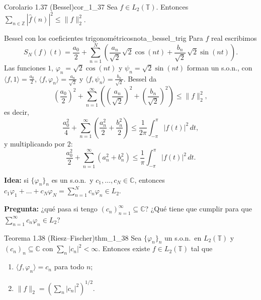 \begin{proposicion}{Corolario 1.37 (Bessel)}{cor_1_37}
Sea $f \in L_2(\mathbb{T})$. Entonces $\displaystyle\sum_{n\in\mathbb{Z}}|\hat{f}(n)|^2 \le \|f\|_2^2$.
\end{proposicion}

\begin{nota}{Bessel con los coeficientes trigonométricos}{nota_bessel_trig}
Para $f$ real escribimos
\[
S_N(f)(t) = \frac{a_0}{2} + \sum_{n=1}^{N}\left(\frac{a_n}{\sqrt{2}}\,\sqrt{2}\cos(nt) + \frac{b_n}{\sqrt{2}}\,\sqrt{2}\sin(nt)\right).
\]
Las funciones $1$, $\varphi_n = \sqrt{2}\cos(nt)$ y $\psi_n = \sqrt{2}\sin(nt)$ forman un s.o.n., con $\langle f, 1\rangle = \frac{a_0}{2}$, $\langle f, \varphi_n\rangle = \frac{a_n}{\sqrt{2}}$ y $\langle f, \psi_n\rangle = \frac{b_n}{\sqrt{2}}$. Bessel da
\[
\left(\frac{a_0}{2}\right)^2 + \sum_{n=1}^{\infty}\left(\left(\frac{a_n}{\sqrt{2}}\right)^2 + \left(\frac{b_n}{\sqrt{2}}\right)^2\right) \le \|f\|_2^2,
\]
es decir,
\[
\frac{a_0^2}{4} + \sum_{n=1}^{\infty}\left(\frac{a_n^2}{2} + \frac{b_n^2}{2}\right) \le \frac{1}{2\pi}\int_{-\pi}^{\pi}|f(t)|^2\,dt,
\]
y multiplicando por $2$:
\[
\frac{a_0^2}{2} + \sum_{n=1}^{\infty}(a_n^2 + b_n^2) \le \frac{1}{\pi}\int_{-\pi}^{\pi}|f(t)|^2\,dt.
\]
\end{nota}

\textbf{Idea:} si $\{\varphi_n\}_n$ es un s.o.n.\ y $c_1, \dots, c_N \in \mathbb{C}$, entonces $c_1\varphi_1 + \dots + c_N\varphi_N = \sum_{n=1}^{N}c_n\varphi_n \in L_2$.

\textbf{Pregunta:} ¿qué pasa si tengo $(c_n)_{n=1}^{\infty} \subseteq \mathbb{C}$? ¿Qué tiene que cumplir para que $\sum_{n=1}^{\infty}c_n\varphi_n \in L_2$?

\begin{teorema}{Teorema 1.38 (Riesz--Fischer)}{thm_1_38}
Sea $\{\varphi_n\}_n$ un s.o.n.\ en $L_2(\mathbb{T})$ y $(c_n)_n \subseteq \mathbb{C}$ con $\sum_n |c_n|^2 < \infty$. Entonces existe $f \in L_2(\mathbb{T})$ tal que
\begin{enumerate}
\item[(1)] $\langle f, \varphi_n\rangle = c_n$ para todo $n$;
\item[(2)] $\|f\|_2 = \left(\sum_n |c_n|^2\right)^{1/2}$.
\end{enumerate}
\end{teorema}

